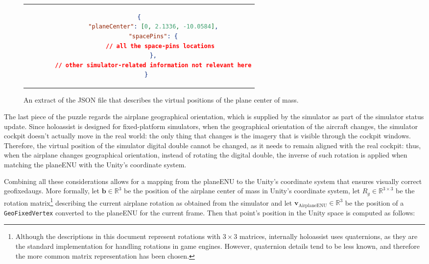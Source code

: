 \begin{figure}
  \centering
  \begin{tabular}{c}
  \begin{lstlisting}[language=json]
    {
        "planeCenter": [0, 2.1336, -10.0584],
        "spacePins": {
            // all the space-pins locations
        },
        // other simulator-related information not relevant here
    }
  \end{lstlisting}
  \end{tabular}
  \caption{An extract of the JSON file that describes the virtual positions of the plane center of mass.}\label{lst:plane_center_of_mass_virtual_positions_json}
\end{figure}

The last piece of the puzzle regards the airplane geographical orientation, which is supplied by the simulator as part of the simulator status update. Since \gls{holoassist} is designed for fixed-platform simulators, when the geographical orientation of the aircraft changes, the simulator cockpit doesn't actually move in the real world: the only thing that changes is the imagery that is visible through the cockpit windows. Therefore, the virtual position of the simulator digital double cannot be changed, as it needs to remain aligned with the real cockpit: thus, when the airplane changes geographical orientation, instead of rotating the digital double, the inverse of such rotation is applied when matching the \gls{planeENU} with the Unity's coordinate system.

Combining all these considerations allows for a mapping from the \gls{planeENU} to the Unity's coordinate system that ensures visually correct \glspl{geofixedaug}. More formally, let $\mathbf{b} \in \mathbb{R}^3$ be the position of the airplane center of mass in Unity's coordinate system, let $R_{g} \in \mathbb{R}^{3\times3}$ be the rotation matrix\footnote{Although the descriptions in this document represent rotations with $3\times3$ matrices, internally \gls{holoassist} uses quaternions\cite{noauthor_quaternions_2022}, as they are the standard implementation for handling rotations in game engines. However, quaternion details tend to be less known, and therefore the more common matrix representation has been chosen.} describing the current airplane rotation as obtained from the simulator and let $\mathbf{v}_{\text{AirplaneENU}} \in \mathbb{R}^3$ be the position of a \texttt{GeoFixedVertex} converted to the \gls{planeENU} for the current frame. Then that point's position in the Unity space is computed as follows:

